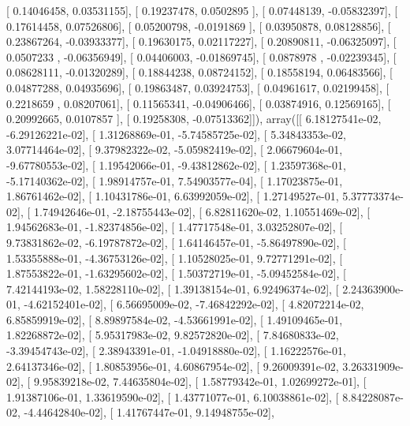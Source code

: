 \documentclass{article}
\begin{document}
       [ 0.14046458,  0.03531155],
       [ 0.19237478,  0.0502895 ],
       [ 0.07448139, -0.05832397],
       [ 0.17614458,  0.07526806],
       [ 0.05200798, -0.0191869 ],
       [ 0.03950878,  0.08128856],
       [ 0.23867264, -0.03933377],
       [ 0.19630175,  0.02117227],
       [ 0.20890811, -0.06325097],
       [ 0.0507233 , -0.06356949],
       [ 0.04406003, -0.01869745],
       [ 0.0878978 , -0.02239345],
       [ 0.08628111, -0.01320289],
       [ 0.18844238,  0.08724152],
       [ 0.18558194,  0.06483566],
       [ 0.04877288,  0.04935696],
       [ 0.19863487,  0.03924753],
       [ 0.04961617,  0.02199458],
       [ 0.2218659 ,  0.08207061],
       [ 0.11565341, -0.04906466],
       [ 0.03874916,  0.12569165],
       [ 0.20992665,  0.0107857 ],
       [ 0.19258308, -0.07513362]]), array([[  6.18127541e-02,  -6.29126221e-02],
       [  1.31268869e-01,  -5.74585725e-02],
       [  5.34843353e-02,   3.07714464e-02],
       [  9.37982322e-02,  -5.05982419e-02],
       [  2.06679604e-01,  -9.67780553e-02],
       [  1.19542066e-01,  -9.43812862e-02],
       [  1.23597368e-01,  -5.17140362e-02],
       [  1.98914757e-01,   7.54903577e-04],
       [  1.17023875e-01,   1.86761462e-02],
       [  1.10431786e-01,   6.63992059e-02],
       [  1.27149527e-01,   5.37773374e-02],
       [  1.74942646e-01,  -2.18755443e-02],
       [  6.82811620e-02,   1.10551469e-02],
       [  1.94562683e-01,  -1.82374856e-02],
       [  1.47717548e-01,   3.03252807e-02],
       [  9.73831862e-02,  -6.19787872e-02],
       [  1.64146457e-01,  -5.86497890e-02],
       [  1.53355888e-01,  -4.36753126e-02],
       [  1.10528025e-01,   9.72771291e-02],
       [  1.87553822e-01,  -1.63295602e-02],
       [  1.50372719e-01,  -5.09452584e-02],
       [  7.42144193e-02,   1.58228110e-02],
       [  1.39138154e-01,   6.92496374e-02],
       [  2.24363900e-01,  -4.62152401e-02],
       [  6.56695009e-02,  -7.46842292e-02],
       [  4.82072214e-02,   6.85859919e-02],
       [  8.89897584e-02,  -4.53661991e-02],
       [  1.49109465e-01,   1.82268872e-02],
       [  5.95317983e-02,   9.82572820e-02],
       [  7.84680833e-02,  -3.39454743e-02],
       [  2.38943391e-01,  -1.04918880e-02],
       [  1.16222576e-01,   2.64137346e-02],
       [  1.80853956e-01,   4.60867954e-02],
       [  9.26009391e-02,   3.26331909e-02],
       [  9.95839218e-02,   7.44635804e-02],
       [  1.58779342e-01,   1.02699272e-01],
       [  1.91387106e-01,   1.33619590e-02],
       [  1.43771077e-01,   6.10038861e-02],
       [  8.84228087e-02,  -4.44642840e-02],
       [  1.41767447e-01,   9.14948755e-02],
\end{document}
